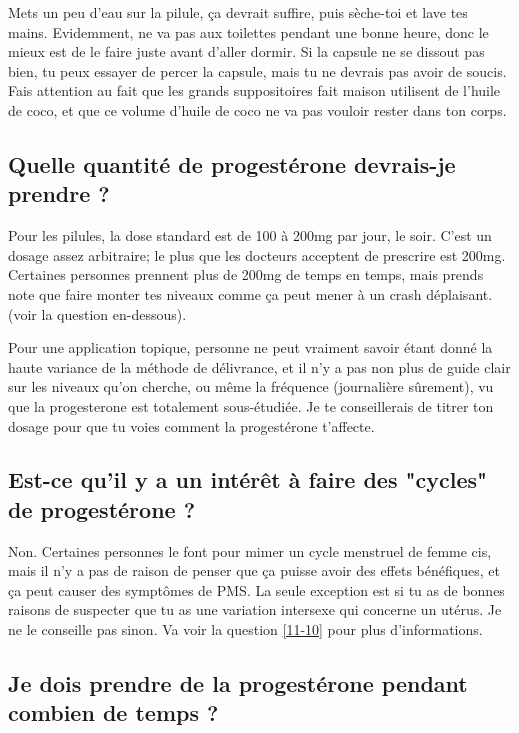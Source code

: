 \documentclass{article}
\begin{document}
Mets un peu d'eau sur la pilule, ça devrait suffire, puis sèche-toi et lave tes mains. Evidemment, ne va pas aux toilettes pendant une bonne heure, donc le mieux est de le faire juste avant d'aller dormir. Si la capsule ne se dissout pas bien, tu peux essayer de percer la capsule, mais tu ne devrais pas avoir de soucis. Fais attention au fait que les grands suppositoires fait maison utilisent de l'huile de coco, et que ce volume d'huile de coco ne va pas vouloir rester dans ton corps.  

\subsection{Quelle quantité de progestérone devrais-je prendre ?}

Pour les pilules, la dose standard est de 100 à 200mg par jour, le soir. C'est un dosage assez arbitraire; le plus que les docteurs acceptent de prescrire est 200mg. Certaines personnes prennent plus de 200mg de temps en temps, mais prends note que faire monter tes niveaux comme ça peut mener à un crash déplaisant. (voir la question en-dessous).

Pour une application topique, personne ne peut vraiment savoir étant donné la haute variance de la méthode de délivrance, et il n'y a pas non plus de guide clair sur les niveaux qu'on cherche, ou même la fréquence (journalière sûrement), vu que la progesterone est totalement sous-étudiée. Je te conseillerais de titrer ton dosage pour que tu voies comment la progestérone t'affecte.

\subsection{Est-ce qu'il y a un intérêt à faire des "cycles" de progestérone ?}\label{8-11}

Non. Certaines personnes le font pour mimer un cycle menstruel de femme cis, mais il n'y a pas de raison de penser que ça puisse avoir des effets bénéfiques, et ça peut causer des symptômes de PMS. La seule exception est si tu as de bonnes raisons de suspecter que tu as une variation intersexe qui concerne un utérus. Je ne le conseille pas sinon. Va voir la question \ref{11-10} pour plus d'informations. 

\subsection{Je dois prendre de la progestérone pendant combien de temps ?}
\end{document}
